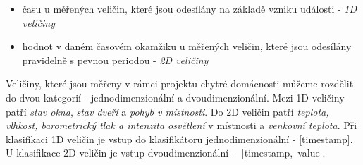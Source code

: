 \begin{itemize}
	\item času u měřených veličin, které jsou odesílány na základě vzniku události - \textit{1D veličiny}
	\item hodnot v daném časovém okamžiku u měřených veličin, které jsou odesílány pravidelně s pevnou periodou - \textit{2D veličiny}
\end{itemize}

Veličiny, které jsou měřeny v rámci projektu chytré domácnosti můžeme rozdělit do dvou kategorií - jednodimenzionální a dvoudimenzionální. Mezi 1D veličiny patří \textit{stav okna}, \textit{stav dveří} a \textit{pohyb v místnosti}. Do 2D veličin patří \textit{teplota, vlhkost, barometrický tlak a intenzita osvětlení} v místnosti a \textit{venkovní teplota}. Při klasifikaci 1D veličin je vstup do klasifikátoru jednodimenzionální - [timestamp]. U klasifikace 2D veličin je vstup \mbox{dvoudimenzionální - [timestamp, value].} 

